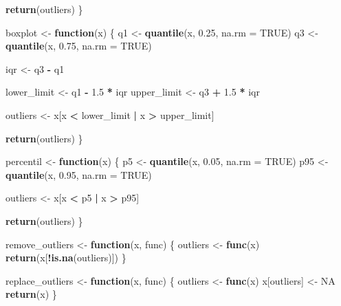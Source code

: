 \documentclass[notspecified,article,submit,moreauthors,pdftex]{Definitions/mdpi}
\newenvironment{Shaded}{\begin{snugshade}}{\end{snugshade}}
\newcommand{\AttributeTok}[1]{\textcolor[rgb]{0.13,0.29,0.53}{#1}}
\newcommand{\ConstantTok}[1]{\textcolor[rgb]{0.56,0.35,0.01}{#1}}
\newcommand{\ControlFlowTok}[1]{\textcolor[rgb]{0.13,0.29,0.53}{\textbf{#1}}}
\newcommand{\FloatTok}[1]{\textcolor[rgb]{0.00,0.00,0.81}{#1}}
\newcommand{\FunctionTok}[1]{\textcolor[rgb]{0.13,0.29,0.53}{\textbf{#1}}}
\newcommand{\NormalTok}[1]{#1}
\newcommand{\OtherTok}[1]{\textcolor[rgb]{0.56,0.35,0.01}{#1}}
\newcommand{\SpecialCharTok}[1]{\textcolor[rgb]{0.81,0.36,0.00}{\textbf{#1}}}
\begin{document}
\begin{Shaded}
\begin{Highlighting}[]
  \FunctionTok{return}\NormalTok{(outliers)}
\NormalTok{\}}

\NormalTok{boxplot }\OtherTok{\textless{}{-}} \ControlFlowTok{function}\NormalTok{(x) \{}
\NormalTok{  q1 }\OtherTok{\textless{}{-}} \FunctionTok{quantile}\NormalTok{(x, }\FloatTok{0.25}\NormalTok{, }\AttributeTok{na.rm =} \ConstantTok{TRUE}\NormalTok{)}
\NormalTok{  q3 }\OtherTok{\textless{}{-}} \FunctionTok{quantile}\NormalTok{(x, }\FloatTok{0.75}\NormalTok{, }\AttributeTok{na.rm =} \ConstantTok{TRUE}\NormalTok{)}
  
\NormalTok{  iqr }\OtherTok{\textless{}{-}}\NormalTok{ q3 }\SpecialCharTok{{-}}\NormalTok{ q1}
  
\NormalTok{  lower\_limit }\OtherTok{\textless{}{-}}\NormalTok{ q1 }\SpecialCharTok{{-}} \FloatTok{1.5} \SpecialCharTok{*}\NormalTok{ iqr}
\NormalTok{  upper\_limit }\OtherTok{\textless{}{-}}\NormalTok{ q3 }\SpecialCharTok{+} \FloatTok{1.5} \SpecialCharTok{*}\NormalTok{ iqr}
  
\NormalTok{  outliers }\OtherTok{\textless{}{-}}\NormalTok{ x[x }\SpecialCharTok{\textless{}}\NormalTok{ lower\_limit }\SpecialCharTok{|}\NormalTok{ x }\SpecialCharTok{\textgreater{}}\NormalTok{ upper\_limit]}
  
  \FunctionTok{return}\NormalTok{(outliers)}
\NormalTok{\}}

\NormalTok{percentil }\OtherTok{\textless{}{-}} \ControlFlowTok{function}\NormalTok{(x) \{}
\NormalTok{  p5 }\OtherTok{\textless{}{-}} \FunctionTok{quantile}\NormalTok{(x, }\FloatTok{0.05}\NormalTok{, }\AttributeTok{na.rm =} \ConstantTok{TRUE}\NormalTok{)}
\NormalTok{  p95 }\OtherTok{\textless{}{-}} \FunctionTok{quantile}\NormalTok{(x, }\FloatTok{0.95}\NormalTok{, }\AttributeTok{na.rm =} \ConstantTok{TRUE}\NormalTok{)}
  
\NormalTok{  outliers }\OtherTok{\textless{}{-}}\NormalTok{ x[x }\SpecialCharTok{\textless{}}\NormalTok{ p5 }\SpecialCharTok{|}\NormalTok{ x }\SpecialCharTok{\textgreater{}}\NormalTok{ p95]}
  
  \FunctionTok{return}\NormalTok{(outliers)}
\NormalTok{\}}

\NormalTok{remove\_outliers }\OtherTok{\textless{}{-}} \ControlFlowTok{function}\NormalTok{(x, func) \{}
\NormalTok{  outliers }\OtherTok{\textless{}{-}} \FunctionTok{func}\NormalTok{(x)}
  \FunctionTok{return}\NormalTok{(x[}\SpecialCharTok{!}\FunctionTok{is.na}\NormalTok{(outliers)])}
\NormalTok{\}}

\NormalTok{replace\_outliers }\OtherTok{\textless{}{-}} \ControlFlowTok{function}\NormalTok{(x, func) \{}
\NormalTok{  outliers }\OtherTok{\textless{}{-}} \FunctionTok{func}\NormalTok{(x)}
\NormalTok{  x[outliers] }\OtherTok{\textless{}{-}} \ConstantTok{NA}
  \FunctionTok{return}\NormalTok{(x)}
\NormalTok{\}}
\end{Highlighting}
\end{Shaded}
\end{document}
